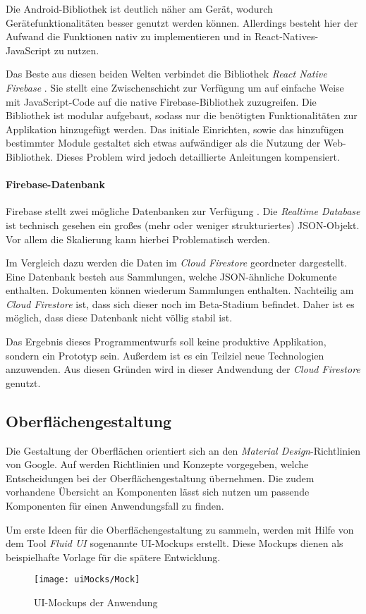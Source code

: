Die Android-Bibliothek ist deutlich näher am Gerät, wodurch Gerätefunktionalitäten besser genutzt werden können.
Allerdings besteht hier der Aufwand die Funktionen nativ zu implementieren und in React-Natives-JavaScript zu nutzen.

Das Beste aus diesen beiden Welten verbindet die Bibliothek \textit{React Native Firebase} \cite{invertas78:online}.
Sie stellt eine Zwischenschicht zur Verfügung um auf einfache Weise mit JavaScript-Code auf die native Firebase-Bibliothek zuzugreifen.
Die Bibliothek ist modular aufgebaut, sodass nur die benötigten Funktionalitäten zur Applikation hinzugefügt werden.
Das initiale Einrichten, sowie das hinzufügen bestimmter Module gestaltet sich etwas aufwändiger als die Nutzung der Web-Bibliothek.
Dieses Problem wird jedoch detaillierte Anleitungen kompensiert.

\paragraph{Firebase-Datenbank}
Firebase stellt zwei mögliche Datenbanken zur Verfügung \cite{ChooseaD77:online}.
Die \textit{Realtime Database} ist technisch gesehen ein großes (mehr oder weniger strukturiertes) JSON-Objekt.
Vor allem die Skalierung kann hierbei Problematisch werden.

Im Vergleich dazu werden die Daten im \textit{Cloud Firestore} geordneter dargestellt.
Eine Datenbank besteh aus Sammlungen, welche JSON-ähnliche Dokumente enthalten.
Dokumenten können wiederum Sammlungen enthalten.
Nachteilig am \textit{Cloud Firestore} ist, dass sich dieser noch im Beta-Stadium befindet.
Daher ist es möglich, dass diese Datenbank nicht völlig stabil ist.

Das Ergebnis dieses Programmentwurfs soll keine produktive Applikation, sondern ein Prototyp sein.
Außerdem ist es ein Teilziel neue Technologien anzuwenden.
Aus diesen Gründen wird in dieser Andwendung der \textit{Cloud Firestore} genutzt.

\subsection{Oberflächengestaltung}
Die Gestaltung der Oberflächen orientiert sich an den \textit{Material Design}-Richtlinien von Google.
Auf \cite{DesignMa49:online} werden Richtlinien und Konzepte vorgegeben,
welche Entscheidungen bei der Oberflächengestaltung übernehmen.
Die zudem vorhandene Übersicht an Komponenten lässt sich nutzen um passende Komponenten für einen Anwendungsfall zu finden.

Um erste Ideen für die Oberflächengestaltung zu sammeln,
werden mit Hilfe von dem Tool \textit{Fluid UI} \cite{FluidUIc8:online} sogenannte UI-Mockups erstellt.
Diese Mockups dienen als beispielhafte Vorlage für die spätere Entwicklung.


\begin{figure}[h]
    \centering
    \texttt{[image: uiMocks/Mock]}
    \caption{UI-Mockups der Anwendung}
\end{figure}



